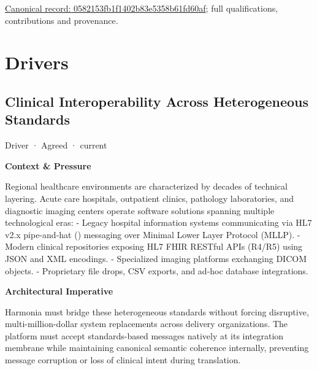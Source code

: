 {\footnotesize \href{../../../../continuum/motivation/outcome/0582153fb1f1402b83e5358b61fd60af.md}{Canonical record: 0582153fb1f1402b83e5358b61fd60af}; full qualifications, contributions and provenance.}\par
\chapter{Drivers}

\section{Clinical Interoperability Across Heterogeneous Standards}

\label{element:921d7cf84d2b4abca0deb0d300fa75ea}
{\small Driver · Agreed · current}\par

\par\medskip\textbf{Context \& Pressure}\par


Regional healthcare environments are characterized by decades of technical layering. Acute care hospitals, outpatient clinics, pathology laboratories, and diagnostic imaging centers operate software solutions spanning multiple technological eras:
- Legacy hospital information systems communicating via HL7 v2.x pipe-and-hat (\texttt{}) messaging over Minimal Lower Layer Protocol (MLLP).
- Modern clinical repositories exposing HL7 FHIR RESTful APIs (R4/R5) using JSON and XML encodings.
- Specialized imaging platforms exchanging DICOM objects.
- Proprietary file drops, CSV exports, and ad-hoc database integrations.



\par\medskip\textbf{Architectural Imperative}\par


Harmonia must bridge these heterogeneous standards without forcing disruptive, multi-million-dollar system replacements across delivery organizations. The platform must accept standards-based messages natively at its integration membrane while maintaining canonical semantic coherence internally, preventing message corruption or loss of clinical intent during translation.



